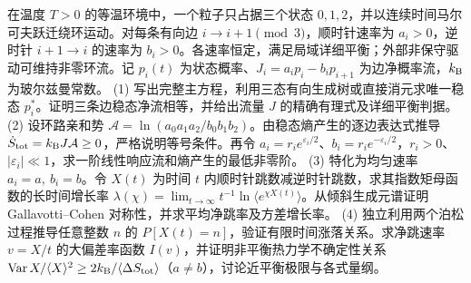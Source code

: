 在温度 \(T>0\) 的等温环境中，一个粒子只占据三个状态 \(0,1,2\)，并以连续时间马尔可夫跃迁绕环运动。对每条有向边 \(i\to i+1\pmod3\)，顺时针速率为 \(a_i>0\)，逆时针 \(i+1\to i\) 的速率为 \(b_i>0\)。各速率恒定，满足局域详细平衡；外部非保守驱动可维持非零环流。记 \(p_i(t)\) 为状态概率、\(J_i=a_ip_i-b_ip_{i+1}\) 为边净概率流，\(k_{\rm B}\) 为玻尔兹曼常数。
(1) 写出完整主方程，利用三态有向生成树或直接消元求唯一稳态 \(p_i^*\)。证明三条边稳态净流相等，并给出流量 \(J\) 的精确有理式及详细平衡判据。
(2) 设环路亲和势 \(\mathcal A=\ln(a_0a_1a_2/b_0b_1b_2)\)。由稳态熵产生的逐边表达式推导 \(\dot S_{\rm tot}=k_{\rm B}J\mathcal A\ge0\)，严格说明等号条件。再令 \(a_i=r_i e^{\varepsilon_i/2}\)、\(b_i=r_i e^{-\varepsilon_i/2}\)，\(r_i>0\)、\(|\varepsilon_i|\ll1\)，求一阶线性响应流和熵产生的最低非零阶。
(3) 特化为均匀速率 \(a_i=a,\ b_i=b\)。令 \(X(t)\) 为时间 \(t\) 内顺时针跳数减逆时针跳数，求其指数矩母函数的长时间增长率 \(\lambda(\chi)=\lim_{t\to\infty}t^{-1}\ln\langle e^{\chi X(t)}\rangle\)。从倾斜生成元谱证明 Gallavotti--Cohen 对称性，并求平均净跳率及方差增长率。
(4) 独立利用两个泊松过程推导任意整数 \(n\) 的 \(P[X(t)=n]\)，验证有限时间涨落关系。求净跳速率 \(v=X/t\) 的大偏差率函数 \(I(v)\)，并证明非平衡热力学不确定性关系 \(\operatorname{Var}X/\langle X\rangle^2\ge2k_{\rm B}/\langle\Delta S_{\rm tot}\rangle\)（\(a\ne b\)），讨论近平衡极限与各式量纲。
